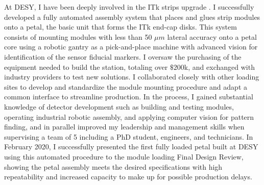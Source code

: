 \documentclass[a4paper]{article}
\begin{document}
At DESY, I have been deeply involved in the ITk strips upgrade \cite{ITKstrips}. I successfully developed a fully automated assembly system that places and glues strip modules onto a petal, the basic unit that forms the ITk end-cap disks. This system consists of mounting modules with less than 50 $\mu m$ lateral accuracy onto a petal core using a robotic gantry as a pick-and-place machine with advanced vision for identification of the sensor fiducial markers. I oversaw the purchasing of the equipment needed to build the station, totaling over $\$200$k, and exchanged with industry providers to test new solutions. I collaborated closely with other loading sites to develop and standardize the module mounting procedure and adapt a common interface to streamline production. In the process, I gained substantial knowledge of detector development such as building and testing modules, operating industrial robotic assembly, and applying computer vision for pattern finding, and in parallel improved my leadership and management skills when supervising a team of 5 including a PhD student, engineers, and technicians. In February 2020, I successfully presented the first fully loaded petal built at DESY using this automated procedure to the module loading Final Design Review, showing the petal assembly meets the desired specifications with high repeatability and increased capacity to make up for possible production delays.

\bigskip
\end{document}
